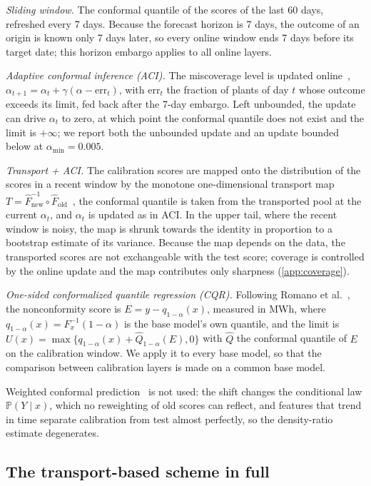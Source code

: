 \emph{Sliding window.} The conformal quantile of the scores of the last 60 days, refreshed every 7 days. Because the forecast horizon is 7 days, the outcome of an origin is known only 7 days later, so every online window ends 7 days before its target date; this horizon embargo applies to all online layers.

\emph{Adaptive conformal inference (ACI).} The miscoverage level is updated online~\cite{gibbs2021}, $\alpha_{t+1}=\alpha_t+\gamma(\alpha-\mathrm{err}_t)$, with $\mathrm{err}_t$ the fraction of plants of day $t$ whose outcome exceeds its limit, fed back after the 7-day embargo. Left unbounded, the update can drive $\alpha_t$ to zero, at which point the conformal quantile does not exist and the limit is $+\infty$; we report both the unbounded update and an update bounded below at $\alpha_{\min}=0.005$.

\emph{Transport + ACI.} The calibration scores are mapped onto the distribution of the scores in a recent window by the monotone one-dimensional transport map $T=\hat F_{\mathrm{new}}^{-1}\circ\hat F_{\mathrm{old}}$~\cite{peyre2019}, the conformal quantile is taken from the transported pool at the current $\alpha_t$, and $\alpha_t$ is updated as in ACI. In the upper tail, where the recent window is noisy, the map is shrunk towards the identity in proportion to a bootstrap estimate of its variance. Because the map depends on the data, the transported scores are not exchangeable with the test score; coverage is controlled by the online update and the map contributes only sharpness (\ref{app:coverage}).

\emph{One-sided conformalized quantile regression (CQR).} Following Romano et al.~\cite{romano2019}, the nonconformity score is $E=y-q_{1-\alpha}(x)$, measured in MWh, where $q_{1-\alpha}(x)=F_x^{-1}(1-\alpha)$ is the base model's own quantile, and the limit is $U(x)=\max\{q_{1-\alpha}(x)+\hat Q_{1-\alpha}(E),0\}$ with $\hat Q$ the conformal quantile of $E$ on the calibration window. We apply it to every base model, so that the comparison between calibration layers is made on a common base model.

Weighted conformal prediction~\cite{tibshirani2019} is not used: the shift changes the conditional law $\mathbb{P}(Y\mid x)$, which no reweighting of old scores can reflect, and features that trend in time separate calibration from test almost perfectly, so the density-ratio estimate degenerates.

\subsection{The transport-based scheme in full}
\label{sec:algoritmo}

